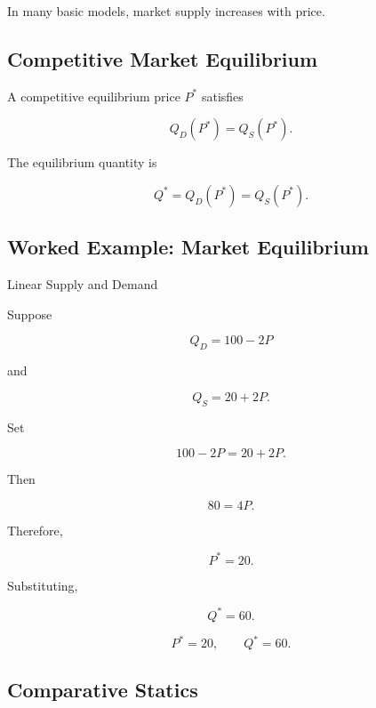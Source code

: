 In many basic models, market supply increases with price.

\subsection{Competitive Market Equilibrium}
\label{subsec:competitive-market-equilibrium}

A competitive equilibrium price \(P^*\) satisfies

\[
\boxed{
Q_D(P^*)
=
Q_S(P^*).
}
\]

The equilibrium quantity is

\[
\boxed{
Q^*
=
Q_D(P^*)
=
Q_S(P^*).
}
\]

\subsection{Worked Example: Market Equilibrium}
\label{subsec:worked-market-equilibrium}

\begin{workedexamplebox}{Linear Supply and Demand}

Suppose

\[
Q_D=100-2P
\]

and

\[
Q_S=20+2P.
\]

Set

\[
100-2P
=
20+2P.
\]

Then

\[
80=4P.
\]

Therefore,

\[
P^*=20.
\]

Substituting,

\[
Q^*
=
60.
\]

\begin{answerbox}
\[
\boxed{
P^*=20,
\qquad
Q^*=60.
}
\]
\end{answerbox}

\end{workedexamplebox}

\subsection{Comparative Statics}
\label{subsec:comparative-statics}

